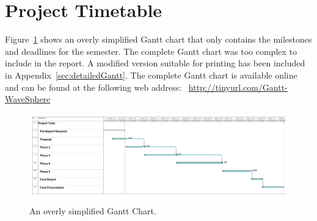\section{Project Timetable}

Figure~\ref{fig:simpleGantt} shows an overly simplified Gantt chart that only contains the milestones and deadlines for the semester.  The complete Gantt chart was too complex to include in the report.  A modified version suitable for printing has been included in Appendix~\ref{sec:detailedGantt}.  The complete Gantt chart is available online and can be found at the following web address: ~\url{http://tinyurl.com/Gantt-WaveSphere}

\begin{figure}[H]
	\centering
	\includegraphics[width=\textwidth]{img/GanttChartCondensed}
	\caption{An overly simplified Gantt Chart. \label{fig:simpleGantt}}
\end{figure}
